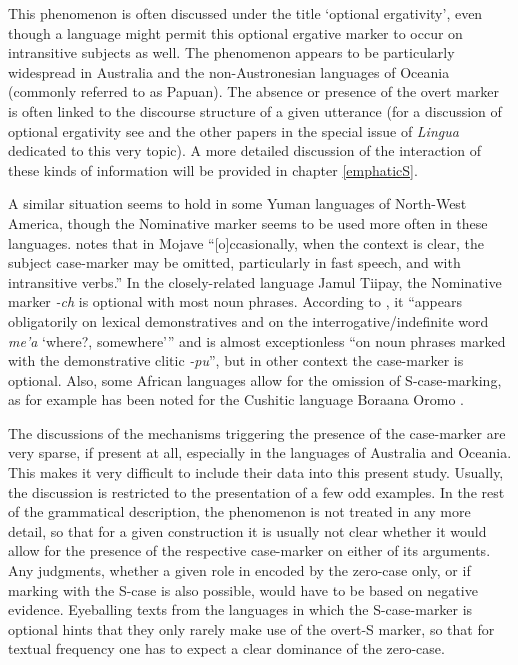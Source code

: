 This phenomenon is often discussed under the title `optional ergativity', even though a language might permit this optional ergative marker to occur on intransitive subjects as well. The phenomenon appears to be particularly widespread in Australia and the non-Austronesian languages of Oceania (commonly referred to as Papuan). 
The absence or presence of the overt marker is often linked to the discourse structure of a given utterance (for a discussion of optional ergativity see \cite{OptionalErg} and the other papers in the special issue of \emph{Lingua} dedicated to this very topic). 
A more detailed discussion of the interaction of these kinds of information will be provided in chapter \ref{emphaticS}. 

A similar situation seems to hold in some Yuman languages of North-West America, though the Nominative marker seems to be used more often in these languages. 
\citet[19]{Munro:1976} notes that in Mojave ``[o]ccasionally, when the context is clear, the subject case-marker may be omitted, particularly in fast speech, and with intransitive verbs.'' 
In the closely-related language Jamul Tiipay, the Nominative marker \emph{-ch} is optional with most noun phrases. 
According to \citet[160]{Miller:2001}, it ``appears obligatorily on lexical demonstratives and on the interrogative/indefinite word \emph{me'a} `where?, somewhere''' and is almost exceptionless ``on noun phrases marked with the demonstrative clitic \emph{-pu}'', but in other context the case-marker is optional. 
Also, some African languages allow for the omission of S-case-marking, as for example has been noted for the Cushitic language Boraana Oromo \citep[93]{Stroomer:1995}.
   
The discussions of the mechanisms triggering the presence of the case-marker are very sparse, if present at all, especially in the languages of Australia and Oceania. 
This makes it very difficult to include their data into this present study.  
Usually, the discussion is restricted to the presentation of a few odd examples. 
In the rest of the grammatical description, the phenomenon is not treated in any more detail, so that for a given construction it is usually not clear whether it would allow for the presence of the respective case-marker on either of its arguments. 
Any judgments, whether a given role in encoded by the zero-case only, or if marking with the S-case is also possible, would have to be based on negative evidence. 
Eyeballing texts from the languages in which the S-case-marker is optional hints that they only rarely make use of the overt-S marker, so that for textual frequency one has to expect a clear dominance of the zero-case.

